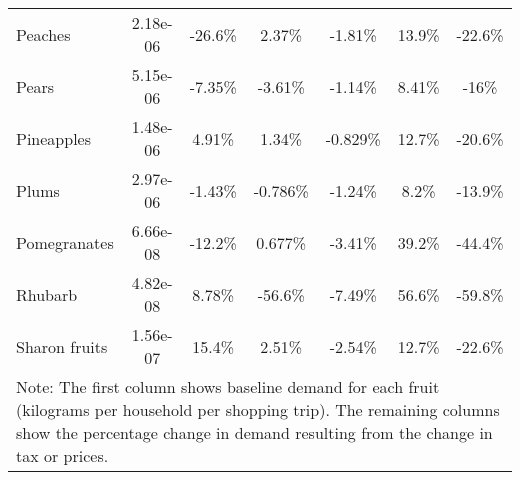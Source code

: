 \documentclass[11pt]{article}
\begin{document}
\begin{table}[h]
\begin{center}
{\begin{tabular}{lcccccc}
\hline
Peaches &2.18e-06 &-26.6\% &2.37\% &-1.81\% &13.9\% &-22.6\% \\
Pears &5.15e-06 &-7.35\% &-3.61\% &-1.14\% &8.41\% &-16\% \\
Pineapples &1.48e-06 &4.91\% &1.34\% &-0.829\% &12.7\% &-20.6\% \\
Plums &2.97e-06 &-1.43\% &-0.786\% &-1.24\% &8.2\% &-13.9\% \\
Pomegranates &6.66e-08 &-12.2\% &0.677\% &-3.41\% &39.2\% &-44.4\% \\
\hline
Rhubarb &4.82e-08 &8.78\% &-56.6\% &-7.49\% &56.6\% &-59.8\% \\
Sharon fruits &1.56e-07 &15.4\% &2.51\% &-2.54\% &12.7\% &-22.6\% \\
 \hline \hline
\multicolumn{7}{p{1.0 \textwidth}}{Note: The first column shows baseline demand for each fruit (kilograms per household per shopping trip). The remaining columns show the percentage change in demand resulting from the change in tax or prices.}
\end{tabular}}
\end{center}
\end{table}
\end{document}
